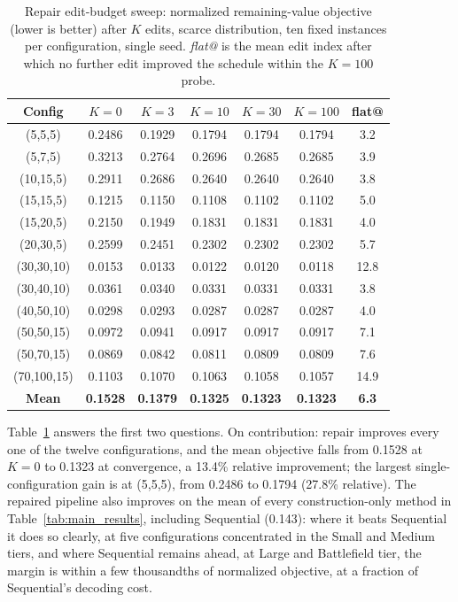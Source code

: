 \begin{table}[htbp]
\centering
\small
\caption{Repair edit-budget sweep: normalized remaining-value objective (lower is better) after $K$ edits, scarce distribution, ten fixed instances per configuration, single seed. \emph{flat@} is the mean edit index after which no further edit improved the schedule within the $K{=}100$ probe.}
\label{tab:repair-sweep}
\begin{tabular}{c|ccccc|c}
\hline
\textbf{Config} & \textbf{$K{=}0$} & \textbf{$K{=}3$} & \textbf{$K{=}10$} & \textbf{$K{=}30$} & \textbf{$K{=}100$} & \textbf{flat@} \\ \hline
(5,5,5)     & 0.2486 & 0.1929 & 0.1794 & 0.1794 & 0.1794 & 3.2 \\
(5,7,5)     & 0.3213 & 0.2764 & 0.2696 & 0.2685 & 0.2685 & 3.9 \\
(10,15,5)   & 0.2911 & 0.2686 & 0.2640 & 0.2640 & 0.2640 & 3.8 \\ \hline
(15,15,5)   & 0.1215 & 0.1150 & 0.1108 & 0.1102 & 0.1102 & 5.0 \\
(15,20,5)   & 0.2150 & 0.1949 & 0.1831 & 0.1831 & 0.1831 & 4.0 \\
(20,30,5)   & 0.2599 & 0.2451 & 0.2302 & 0.2302 & 0.2302 & 5.7 \\ \hline
(30,30,10)  & 0.0153 & 0.0133 & 0.0122 & 0.0120 & 0.0118 & 12.8 \\
(30,40,10)  & 0.0361 & 0.0340 & 0.0331 & 0.0331 & 0.0331 & 3.8 \\
(40,50,10)  & 0.0298 & 0.0293 & 0.0287 & 0.0287 & 0.0287 & 4.0 \\ \hline
(50,50,15)  & 0.0972 & 0.0941 & 0.0917 & 0.0917 & 0.0917 & 7.1 \\
(50,70,15)  & 0.0869 & 0.0842 & 0.0811 & 0.0809 & 0.0809 & 7.6 \\
(70,100,15) & 0.1103 & 0.1070 & 0.1063 & 0.1058 & 0.1057 & 14.9 \\ \hline
\textbf{Mean} & \textbf{0.1528} & \textbf{0.1379} & \textbf{0.1325} & \textbf{0.1323} & \textbf{0.1323} & \textbf{6.3} \\ \hline
\end{tabular}
\end{table}

Table~\ref{tab:repair-sweep} answers the first two questions. On contribution: repair improves every one of the twelve configurations, and the mean objective falls from 0.1528 at $K{=}0$ to 0.1323 at convergence, a 13.4\% relative improvement; the largest single-configuration gain is at (5,5,5), from 0.2486 to 0.1794 (27.8\% relative). The repaired pipeline also improves on the mean of every construction-only method in Table~\ref{tab:main_results}, including Sequential (0.143): where it beats Sequential it does so clearly, at five configurations concentrated in the Small and Medium tiers, and where Sequential remains ahead, at Large and Battlefield tier, the margin is within a few thousandths of normalized objective, at a fraction of Sequential's decoding cost.

